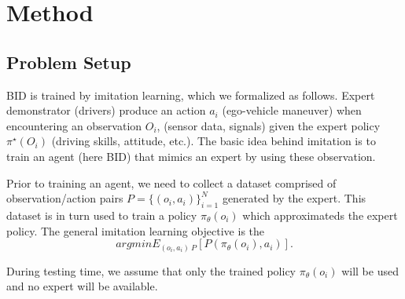 \section{Method}

\subsection{Problem Setup}

\hspace{1pc}BID is trained by imitation learning, which we formalized as follows.
Expert demonstrator (drivers) produce an action $a_i$ (ego-vehicle maneuver) when encountering an observation $O_i$, (sensor data, signals) given the expert policy $\pi^{ \star } (O_i)$ (driving skills, attitude, etc.).
The basic idea behind imitation is to train an agent (here BID) that mimics an expert by using these observation.


Prior to training an agent, we need to collect a dataset comprised of observation/action pairs $P= \{ (o_i, a_i) \}_{i=1} ^N $ generated by the expert.
This dataset is in turn used to train a policy $\pi_\theta (o_i)$ which approximateds the expert policy.
The general imitation learning objective is the 
\begin{equation}
	argmin E_{(o_i, a_i) ~ P} [P(\pi_\theta (o_i), a_i )].
\end{equation}

During testing time, we assume that only the trained policy $ \pi_\theta (o_i) $ will be used and no expert will be available.

